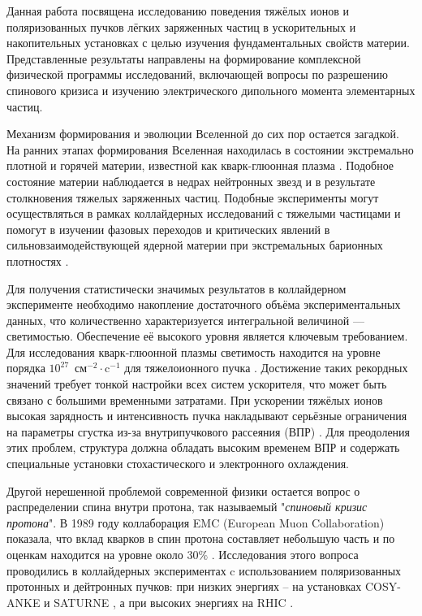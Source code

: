 \par {\actuality} Данная работа посвящена исследованию поведения тяжёлых ионов и поляризованных пучков лёгких заряженных частиц в ускорительных и накопительных установках с целью изучения фундаментальных свойств материи. Представленные результаты направлены на формирование комплексной физической программы исследований, включающей вопросы по разрешению спинового кризиса и изучению электрического дипольного момента элементарных частиц.

\par Механизм формирования и эволюции Вселенной до сих пор остается загадкой. На ранних этапах формирования Вселенная находилась в состоянии экстремально плотной и горячей материи, известной как кварк-глюонная плазма \autocite{phase_transition_universe}. Подобное состояние материи наблюдается в недрах нейтронных звезд \autocite{neutron_stars} и в результате столкновения тяжелых заряженных частиц. Подобные эксперименты могут осуществляться в рамках коллайдерных исследований с тяжелыми частицами и помогут в изучении фазовых переходов и критических явлений в сильновзаимодействующей ядерной материи при экстремальных барионных плотностях \autocite{quark_gluon}.

\par	Для получения статистически значимых результатов в коллайдерном эксперименте необходимо накопление достаточного объёма экспериментальных данных, что количественно характеризуется интегральной величиной — светимостью. Обеспечение её высокого уровня является ключевым требованием. Для исследования кварк-глюонной плазмы светимость находится на уровне порядка $10^{27}$~$\text{см}^{-2}\cdot\text{c}^{-1}$ для тяжелоионного пучка \autocite{RHIC_luminosity_heavy}. Достижение таких рекордных значений требует тонкой настройки всех систем ускорителя, что может быть связано с большими временными затратами. При ускорении тяжёлых ионов высокая зарядность и интенсивность пучка накладывают серьёзные ограничения на параметры сгустка из-за внутрипучкового рассеяния (ВПР) \autocite{2016_IBS}. Для преодоления этих проблем, структура должна обладать высоким временем ВПР и содержать специальные установки стохастического и электронного охлаждения.

\par	Другой нерешенной проблемой современной физики остается вопрос о распределении спина внутри протона, так называемый "\textit{спиновый кризис протона}". В 1989 году коллаборация EMC (European Muon Collaboration) \autocite{spin_crisis_1989} показала, что вклад кварков в спин протона составляет небольшую часть и по оценкам находится на уровне около 30$\%$ \autocite{quarks_overview_2022}. Исследования этого вопроса проводились в коллайдерных экспериментах c использованием поляризованных протонных и дейтронных пучков: при низких энергиях -- на установках COSY-ANKE \autocite{COSY_ANKE} и SATURNE \autocite{SATURNE}, а при высоких энергиях на RHIC \autocite{RHIC_2014}. 

